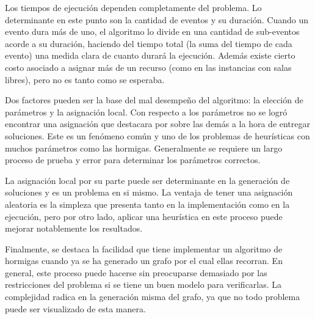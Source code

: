 \documentclass[letter, 10pt]{article}
\begin{document}
Los tiempos de ejecución dependen completamente del problema. Lo
determinante en este punto son la cantidad de eventos y su duración. Cuando un
evento dura más de uno, el algoritmo lo divide en una cantidad de sub-eventos
acorde a su duración, haciendo del tiempo total (la suma del tiempo de cada
evento) una medida clara de cuanto durará la ejecución. Además existe cierto
costo asociado a asignar más de un recurso (como en las instancias con salas
libres), pero no es tanto como se esperaba.

Dos factores pueden ser la base del mal desempeño del algoritmo: la elección de
parámetros y la asignación local. Con respecto a los parámetros no se logró
encontrar una asignación que destacara por sobre las demás a la hora de entregar
soluciones. Este es un fenómeno común y uno de los problemas de heurísticas con
muchos parámetros como las hormigas. Generalmente se requiere un largo proceso
de prueba y error para determinar los parámetros correctos.

La asignación local por su parte puede ser determinante en la generación de
soluciones y es un problema en si mismo. La ventaja de tener una asignación
aleatoria es la simpleza que presenta tanto en la implementación como en la
ejecución, pero por otro lado, aplicar una heurística en este proceso puede
mejorar notablemente los resultados.

Finalmente, se destaca la facilidad que tiene implementar un algoritmo de
hormigas cuando ya se ha generado un grafo por el cual ellas recorran. En
general, este proceso puede hacerse sin preocuparse demasiado por las
restricciones del problema si se tiene un buen modelo para verificarlas.
La complejidad radica en la generación misma del grafo, ya que no todo problema
puede ser visualizado de esta manera.



\end{document}
